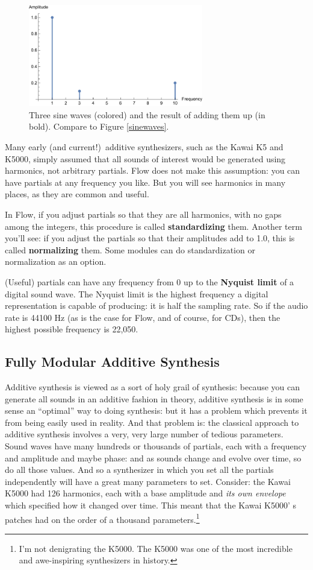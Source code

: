 \documentclass{article}
\newcommand\name{Flow}
\begin{document}
\begin{figure}
\includegraphics[width=3in]{partials}
\caption{Three sine waves (colored) and the result of adding them up (in bold).  Compare to Figure \ref{sinewaves}.}
\label{partials}
\end{figure}

Many early (and current!)\ additive synthesizers, such as the Kawai K5 and K5000, simply assumed that all sounds of interest would be generated using harmonics, not arbitrary partials.   {\name} does not make this assumption: you can have partials at any frequency you like.  But you will see harmonics in many places, as they are common and useful.

In {\name}, if you adjust partials so that they are all harmonics, with no gaps among the integers, this procedure is called {\bf standardizing} them.  Another term you'll see: if you adjust the partials so that their amplitudes add to 1.0, this is called {\bf normalizing} them.  Some modules can do standardization or normalization as an option.

(Useful) partials can have any frequency from 0 up to the {\bf Nyquist limit} of a digital sound wave.  The Nyquist limit is the highest frequency a digital representation is capable of producing: it is half the sampling rate.  So if the audio rate is 44100 Hz (as is the case for {\name}, and of course, for CDs), then the highest possible frequency is 22,050.

\subsection{Fully Modular Additive Synthesis}  Additive synthesis is viewed as a sort of holy grail of synthesis: because you can generate all sounds in an additive fashion in theory, additive synthesis is in some sense an ``optimal'' way to doing synthesis: but it has a problem which prevents it from being easily used in reality.   And that problem is: the classical approach to additive synthesis involves a very, very large number of tedious parameters.  Sound waves have many hundreds or thousands of partials, each with a frequency and amplitude and maybe phase: and as sounds change and evolve over time, so do all those values.  And so a synthesizer in which you set all the partials independently will have a great many parameters to set.  Consider: the Kawai K5000 had 126 harmonics, each with a base amplitude and {\it its own envelope} which specified how it changed over time.  This meant that the Kawai K5000' s patches had on the order of a thousand parameters.\footnote{I'm not denigrating the K5000.  The K5000 was one of the most incredible and awe-inspiring synthesizers in history.}
\end{document}
